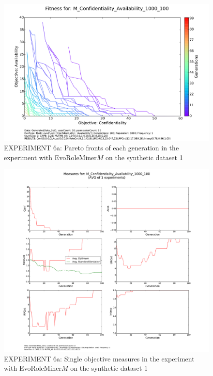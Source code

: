 \begin{figure}[H]
	\centering
	\includegraphics[scale=0.35, trim=0cm 2cm 0cm 2cm, clip=true]{./Figures/exp6_fitness}
	\caption{EXPERIMENT 6a: Pareto fronts of each generation in the experiment with EvoRoleMiner$M$ on the synthetic dataset 1}
	\label{fig:exp6_fitness}
\end{figure}

\begin{figure}[H]
	\centering
	\includegraphics[scale=0.33, trim=4cm 2cm 4cm 0cm, clip=true]{./Figures/exp6_measures}
	\caption{EXPERIMENT 6a: Single objective measures in the experiment with EvoRoleMiner$M$ on the synthetic dataset 1}
	\label{fig:exp6_measures}
\end{figure}


